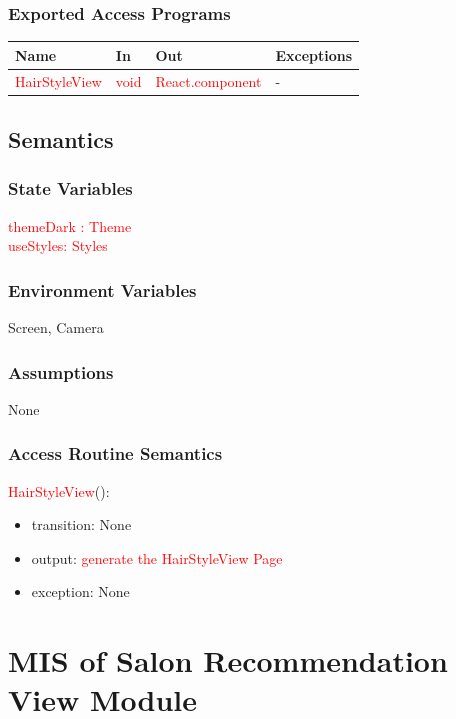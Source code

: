 \documentclass[12pt, titlepage]{article}
\begin{document}
\subsubsection{Exported Access Programs}
\begin{center}
\begin{tabular}{p{4cm} p{3cm} p{4cm} p{4cm}}
\hline
\textbf{Name} & \textbf{In} & \textbf{Out} & \textbf{Exceptions} \\
\hline
\textcolor{red}{HairStyleView} & \textcolor{red}{void} & \textcolor{red}{React.component} & - \\
\hline
\end{tabular}
\end{center}

\subsection{Semantics}

\subsubsection{State Variables}
\textcolor{red}{themeDark : Theme}  \\
\textcolor{red}{useStyles: Styles} 

\subsubsection{Environment Variables}
Screen, Camera

\subsubsection{Assumptions}
None

\subsubsection{Access Routine Semantics}

\noindent \textcolor{red}{HairStyleView}():
\begin{itemize}
\item transition: None  
\item output: \textcolor{red}{generate the HairStyleView Page}
\item exception: None
\end{itemize}

 
\newpage
\section{MIS of Salon Recommendation View Module} \label{Module}
\end{document}
